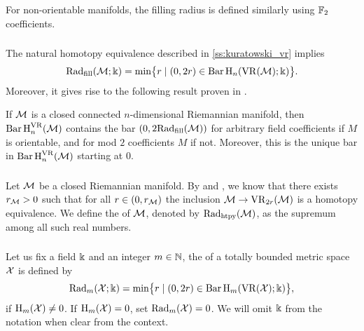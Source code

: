 For non-orientable manifolds, the filling radius is defined similarly using \(\Ftwo\) coefficients.

\subsubsection{}

The natural homotopy equivalence described in \cref{ss:kuratowski_vr} implies 
\[
\fillrad(\cM; \field) = \min\set[\big]{r \mid (0, 2r) \in \barc \rH_n(\VR(\cM); \field)}.
\]
Moreover, it gives rise to the following result proven in \cite[Prop.~9.28]{lim2024vietoris}.

\medskip\lemma
If $\cM$ is a closed connected $n$-dimensional Riemannian manifold, then \(\Hbarc{n}{\cM}\) contains the bar \((0,2\fillrad(\cM))\) for arbitrary field coefficients if $M$ is orientable, and for mod $2$ coefficients $M$ if not.
Moreover, this is the unique bar in \(\Hbarc{n}{\cM}\) starting at $0$.

\subsubsection{}\label{ss:first_critical_value}

Let \(\cM\) be a closed Riemannian manifold.
By \cite[Thm.~3.5]{hausmann1995vietoris} and \cite[Thm.~4.1]{lim2024vietoris}, we know that there exists \(r_\cM > 0\) such that for all \(r \in (0, r_\cM)\) the inclusion \(\cM \to \VR_{2r}(\cM)\) is a homotopy equivalence.
We define the  of \(\cM\), denoted by \(\crit(\cM)\), as the supremum among all such real numbers.

\subsubsection{}

Let us fix a field \(\field\) and an integer \(m \in \N\), the  of a totally bounded metric space \(\cX\) is defined by
\[
\firstdeath{m}{\cX; \field} = \min\set[\big]{r \mid (0, 2r) \in \barc \rH_m(\VR(\cX); \field)},
\]
if \(\rH_\degp(\cX) \neq 0\).
If \(\rH_\degp(\cX) = 0\), set \(\firstdeath{m}{\cX} = 0\).
We will omit \(\field\) from the notation when clear from the context.


